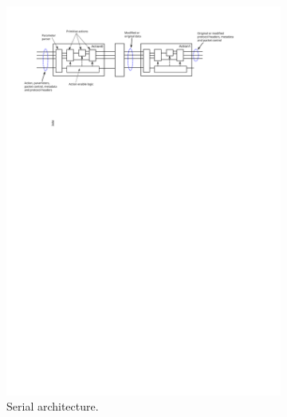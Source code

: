 \begin{figure}[t]
    \centering
    \begin{subfigure}[b]{\textwidth}
        \includegraphics[width=\textwidth]{chapters/pic/action-engine-serial}
        \caption{Serial architecture.}
        \label{fig:actionSerial}
    \end{subfigure}
    ~
    \begin{subfigure}[b]{0.85\textwidth}

\end{subfigure}
\end{figure}
